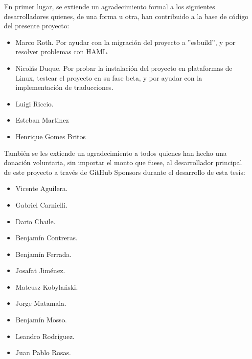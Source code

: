 En primer lugar, se extiende un agradecimiento formal a los siguientes desarrolladores quienes, de una forma u otra, han contribuido a la base de código del presente proyecto:
\begin{itemize}
	\item Marco Roth. Por ayudar con la migración del proyecto a ''esbuild'', y por resolver problemas con HAML.
	\item Nicolás Duque. Por probar la instalación del proyecto en plataformas de Linux, testear el proyecto en su fase beta, y por ayudar con la implementación de traducciones.
	\item Luigi Riccio.
	\item Esteban Martinez
	\item Henrique Gomes Britos
\end{itemize}

También se les extiende un agradecimiento a todos quienes han hecho una donación voluntaria, sin importar el monto que fuese, al desarrollador principal de este proyecto a través de GitHub Sponsors durante el desarrollo de esta tesis:
\begin{itemize}
	\item Vicente Aguilera.
	\item Gabriel Carnielli.
	\item Dario Chaile.
	\item Benjamín Contreras.
	\item Benjamín Ferrada.
	\item Josafat Jiménez.
	\item  Mateusz Kobylański.
	\item Jorge Matamala.
	\item Benjamín Mosso.
	\item Leandro Rodríguez.
	\item Juan Pablo Rosas.
\end{itemize}
